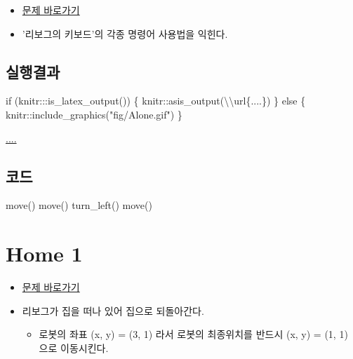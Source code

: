 \documentclass[
  b5paperpaper,
  DIV=11,
  numbers=noendperiod]{scrreprt}
\newenvironment{Shaded}{\begin{snugshade}}{\end{snugshade}}
\newcommand{\ControlFlowTok}[1]{\textcolor[rgb]{0.00,0.23,0.31}{#1}}
\newcommand{\FunctionTok}[1]{\textcolor[rgb]{0.28,0.35,0.67}{#1}}
\newcommand{\NormalTok}[1]{\textcolor[rgb]{0.00,0.23,0.31}{#1}}
\newcommand{\SpecialCharTok}[1]{\textcolor[rgb]{0.37,0.37,0.37}{#1}}
\newcommand{\StringTok}[1]{\textcolor[rgb]{0.13,0.47,0.30}{#1}}
\providecommand{\tightlist}{%
  \setlength{\itemsep}{0pt}\setlength{\parskip}{0pt}}\usepackage{longtable,booktabs,array}
\begin{document}
\begin{itemize}
\tightlist
\item
  \href{https://reeborg.ca/reeborg.html?lang=ko-en\&mode=python\&menu=worlds\%2Fmenus\%2Freeborg_intro_en.json\&name=Alone\&url=worlds\%2Ftutorial_en\%2Falone.json}{문제
  바로가기}
\item
  '리보그의 키보드'의 각종 명령어 사용법을 익힌다.
\end{itemize}

\hypertarget{uxc2e4uxd589uxacb0uxacfc}{%
\subsection{실행결과}\label{uxc2e4uxd589uxacb0uxacfc}}

\begin{Shaded}
\begin{Highlighting}[]
\ControlFlowTok{if}\NormalTok{ (knitr}\SpecialCharTok{:::}\FunctionTok{is\_latex\_output}\NormalTok{()) \{}
\NormalTok{  knitr}\SpecialCharTok{::}\FunctionTok{asis\_output}\NormalTok{(}\StringTok{\textquotesingle{}}\SpecialCharTok{\textbackslash{}\textbackslash{}}\StringTok{url\{....\}\textquotesingle{}}\NormalTok{)}
\NormalTok{\} }\ControlFlowTok{else}\NormalTok{ \{}
\NormalTok{  knitr}\SpecialCharTok{::}\FunctionTok{include\_graphics}\NormalTok{(}\StringTok{"fig/Alone.gif"}\NormalTok{)}
\NormalTok{\}}
\end{Highlighting}
\end{Shaded}

\url{....}

\hypertarget{uxcf54uxb4dc}{%
\subsection{코드}\label{uxcf54uxb4dc}}

\begin{Shaded}
\begin{Highlighting}[]
\FunctionTok{move}\NormalTok{()}
\FunctionTok{move}\NormalTok{()}
\FunctionTok{turn\_left}\NormalTok{()}
\FunctionTok{move}\NormalTok{()}
\end{Highlighting}
\end{Shaded}

\hypertarget{home-01}{%
\section{Home 1}\label{home-01}}

\begin{itemize}
\tightlist
\item
  \href{https://reeborg.ca/reeborg.html?lang=ko-en\&mode=python\&menu=worlds\%2Fmenus\%2Freeborg_intro_en.json\&name=Home\%201\&url=worlds\%2Ftutorial_en\%2Fhome1.json}{문제
  바로가기}
\item
  리보그가 집을 떠나 있어 집으로 되돌아간다.

  \begin{itemize}
  \tightlist
  \item
    로봇의 좌표 (x, y) = (3, 1) 라서 로봇의 최종위치를 반드시 (x, y) =
    (1, 1) 으로 이동시킨다.
  \end{itemize}
\end{itemize}
\end{document}
